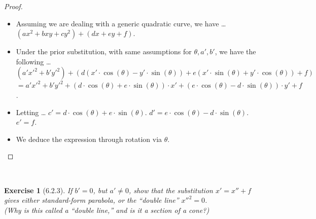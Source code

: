 \documentclass[12pt]{article}
\newcommand{\XB}{\color{black}}
\newcommand{\XBB}{\color{blue}}
\newcommand{\ds}{\displaystyle}
\theoremstyle{plain}
\newtheorem{ex}{Exercise}
\begin{document}
\begin{proof}
  \ \\

  \begin{itemize}
    \item Assuming we are dealing with a generic quadratic curve, we have \dots
    \subitem $ \ds ( ax^{2} + bxy + cy^{2} ) + ( dx + ey + f ) $.
    \item Under the prior substitution, with same assumptions for $ \theta, a', b' $, we have the following \dots
    \subitem $ \ds ( a'x'^{2} + b'y'^{2} ) + ( d ( x' \cdot \cos(\theta) - y' \cdot \sin(\theta) ) + e( x' \cdot \sin(\theta) + y' \cdot \cos(\theta) ) + f ) $
    \subitem $ \ds = a'x'^{2} + b'y'^{2} + ( d \cdot \cos(\theta) + e \cdot \sin(\theta)) \cdot x' + ( e \cdot \cos(\theta) - d \cdot \sin(\theta) ) \cdot y' + f $.
    \item Letting \dots
    \subitem $ \ds c' = d \cdot \cos(\theta) + e \cdot \sin(\theta) $.
    \subitem $ \ds d' = e \cdot \cos(\theta) - d \cdot \sin(\theta) $.
    \subitem $ \ds e' = f $.
    \item We deduce the expression through rotation via $ \theta $.
  \end{itemize}

\end{proof}

\newpage


\XBB\hrulefill\XB \\
\begin{ex} [6.2.3]
  If $ b' = 0 $, but $ a' \neq 0 $, show that the substitution $ x' = x'' + f $ gives either standard-form parabola,
  or the ``double line'' $ x''^{2} = 0 $. \\
  (Why is this called a ``double line,'' and is it a section of a cone?)
\end{ex}
\XBB\hrulefill\XB \\
\end{document}
